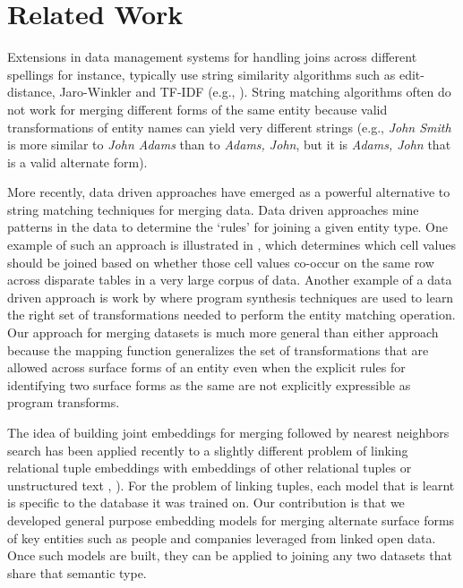 \section{Related Work}
Extensions in data management systems for handling joins across different spellings for instance, typically use string similarity algorithms such as edit-distance, Jaro-Winkler and TF-IDF (e.g., \cite{Cohen2003}).  String matching algorithms often do not work for merging different forms of the same entity because valid transformations of entity names can yield very different strings (e.g., \textit{John Smith} is more similar to \textit{John Adams} than to \textit{Adams, John}, but it is \textit{Adams, John} that is a valid alternate form).

More recently, data driven approaches have emerged as a powerful alternative to string matching techniques for merging data.  Data driven approaches mine patterns in the data to determine the `rules' for joining a given entity type.  One example of such an approach is illustrated in \cite{He:2015:SJS:2824032.2824036}, which determines which cell values should be joined based on whether those cell values co-occur on the same row across disparate tables in a very large corpus of data.  Another example of a data driven approach is work by \cite{auto-join-joining-tables-leveraging-transformations} where program synthesis techniques are used to learn the right set of transformations needed to perform the entity matching operation.  Our approach for merging datasets is much more general than either approach because the mapping function generalizes the set of transformations that are allowed across surface forms of an entity even when the explicit rules for identifying two surface forms as the same are not explicitly expressible as program transforms.

The idea of building joint embeddings for merging followed by nearest neighbors search has been applied recently to a slightly different problem of linking relational tuple embeddings with embeddings of other relational tuples or unstructured text \cite{Bordawekar18}, \cite{IDEL18}).  For the problem of linking tuples, each model that is learnt is specific to the database it was trained on.  Our contribution is that we developed general purpose embedding models for merging alternate surface forms of key entities such as people and companies leveraged from linked open data.  Once such models are built, they can be applied to joining any two datasets that share that semantic type.

